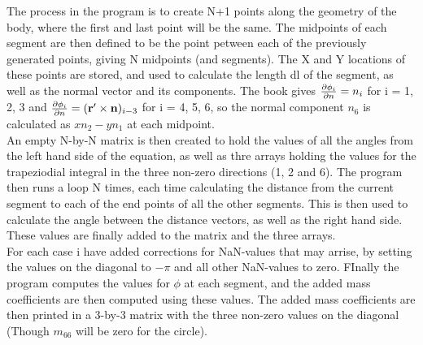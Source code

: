\documentclass[a4paper,english,11pt,twoside]{article}
\begin{document}
The process in the program is to create N+1 points along the geometry of the body, where the first and last point will be the same. The midpoints of each segment are then defined to be the point petween each of the previously generated points, giving N midpoints (and segments). The X and Y locations of these points are stored, and used to calculate the length dl of the segment, as well as the normal vector and its components. The book gives $\frac{\partial \phi_i}{\partial n} = n_i$ for i = 1, 2, 3 and $\frac{\partial \phi_i}{\partial n} = (\mathbf{r'} \times \mathbf{n})_{i-3}$ for i = 4, 5, 6, so the normal component $n_6$ is calculated as $xn_2 - yn_1$ at each midpoint.\\

An empty N-by-N matrix is then created to hold the values of all the angles from the left hand side of the equation, as well as thre arrays holding the values for the trapeziodial integral in the three non-zero directions (1, 2 and 6). The program then runs a loop N times, each time calculating the distance from the current segment to each of the end points of all the other segments. This is then used to calculate the angle between the distance vectors, as well as the right hand side. These values are finally added to the matrix and the three arrays.\\

For each case i have added corrections for NaN-values that may arrise, by setting the values on the diagonal to $-\pi$ and all other NaN-values to zero. FInally the program computes the values for $\phi$ at each segment, and the added mass coefficients are then computed using these values. The added mass coefficients are then printed in a 3-by-3 matrix with the three non-zero values on the diagonal (Though $m_{66}$ will be zero for the circle).


\newpage
\end{document}
